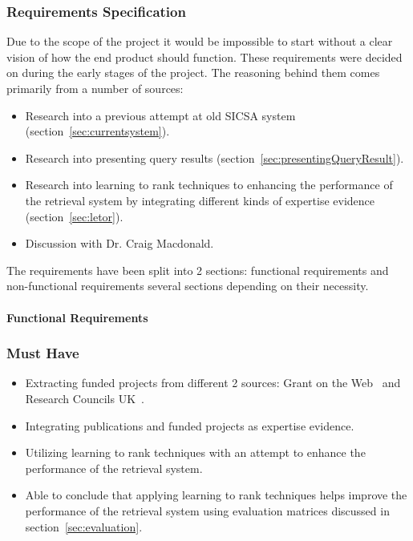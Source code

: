 \subsubsection{Requirements Specification}
Due to the scope of the project it would be impossible to start without a clear vision of how
the end product should function. These requirements were decided on during the early stages of the project. 
The reasoning behind them comes primarily from a number of sources:
\begin{itemize}
 \item Research into a previous attempt at old SICSA system (section~\ref{sec:currentsystem}).
 \item Research into presenting query results (section~\ref{sec:presentingQueryResult}).
 \item Research into learning to rank techniques to enhancing the performance of the retrieval system by integrating different kinds of 
 expertise evidence (section~\ref{sec:letor}).
 \item Discussion with Dr. Craig Macdonald.
\end{itemize}
The requirements have been split into 2 sections: functional requirements and non-functional requirements
several sections depending on their necessity.

\paragraph{Functional Requirements}
\subsubsection{Must Have}
\begin{itemize}
 \item Extracting funded projects from different 2 sources: Grant on the Web~\cite{gow} and Research Councils UK~\cite{gtr}.
 \item Integrating publications and funded projects as expertise evidence.
 \item Utilizing learning to rank techniques with an attempt to enhance the performance of the retrieval system.
 \item Able to conclude that applying learning to rank techniques helps improve the performance of the retrieval system using evaluation matrices discussed
 in section~\ref{sec:evaluation}. 
\end{itemize}

